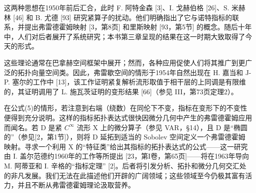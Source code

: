 这两种思想在1950年前后汇合，此时 F. 阿特金森 {[}3{]}、I. 戈赫伯格 {[}26{]}、S. 米赫林 {[}46{]} 和 B. 尤德 {[}93{]} 研究紧算子的扰动。他们明确指出了它与诺特指标的联系，并提出弗雷德霍姆映射 {[}3，第8页{]} 和里斯映射 {[}93，第5节{]} 的概念。随后十年中，人们对后者展开了系统研究；本书第三章呈现的结果在这一时期大致取得了今天的形式。

这些理论通常在巴拿赫空间框架中展开；然而，各种应用促使人们将其推广到更广泛的拓扑向量空间类。因此，弗雷歇空间的情形于1954年自然出现在 H. 嘉当和 J-P. 塞尔的工作中 {[}13{]}，该工作证明紧复解析流形取值于相干层的上同调是有限维的，其证明调用了 L. 施瓦茨证明的变形结果 {[}66{]}（参见 III，第73页定理2）。

在公式(5)的情形，若注意到右端（绕数）在同伦下不变，指标在变形下的不变性便得到充分说明。这样的指标拓扑表达式很快因微分几何中产生的弗雷德霍姆应用而闻名。若 D 是紧 \(C^{\infty}\) 流形 X 上的微分算子（参见 VAR，§14），且 D 是“椭圆的”（参见{[}2，第1节{]}），则将 D 延拓到适当的 Sobolev 空间定义一个弗雷德霍姆映射。寻求一个利用 X 的“特征类”给出其指标的拓扑表达式的公式——这一研究由 I. 盖尔范德约1960年的工作等所提出 {[}23，第I卷，第65页{]}——将在1963年导向 M. 阿蒂亚和 I. 辛格的“指标定理” {[}2{]}。后者将引发分析、拓扑和微分几何交汇处的非凡发展。我们无法在此描述他们开辟的广阔领域；这些领域至今仍极其富有活力，并且不断从弗雷德霍姆理论汲取营养。

